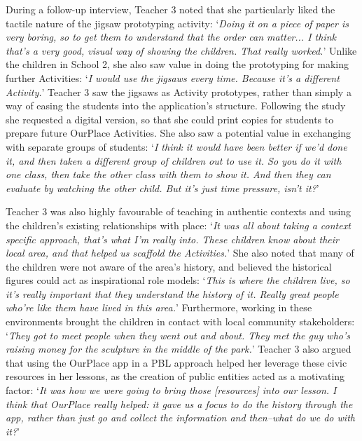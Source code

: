 \documentclass[,hyphens]{sigchi}
\begin{document}
During a follow-up interview, Teacher 3 noted that she particularly liked the tactile nature of the jigsaw prototyping activity: `\textit{Doing it on a piece of paper is very boring, so to get them to understand that the order can matter... I think that's a very good, visual way of showing the children. That really worked.}' Unlike the children in School 2, she also saw value in doing the prototyping for making further Activities: `\textit{I would use the jigsaws every time. Because it's a different Activity.}' Teacher 3 saw the jigsaws as Activity prototypes, rather than simply a way of easing the students into the application's structure. Following the study she requested a digital version, so that she could print copies for students to prepare future OurPlace Activities. She also saw a potential value in exchanging with separate groups of students: `\textit{I think it would have been better if we'd done it, and then taken a different group of children out to use it. So you do it with one class, then take the other class with them to show it. And then they can evaluate by watching the other child. But it's just time pressure, isn't it?}'

Teacher 3 was also highly favourable of teaching in authentic contexts and using the children's existing relationships with place: `\textit{It was all about taking a context specific approach, that's what I'm really into. These children know about their local area, and that helped us scaffold the Activities.}' She also noted that many of the children were not aware of the area's history, and believed the historical figures could act as inspirational role models: `\textit{This is where the children live, so it's really important that they understand the history of it. Really great people who're like them have lived in this area.}' Furthermore, working in these environments brought the children in contact with local community stakeholders: `\textit{They got to meet people when they went out and about. They met the guy who's raising money for the sculpture in the middle of the park.}' Teacher 3 also argued that using the OurPlace app in a PBL approach helped her leverage these civic resources in her lessons, as the creation of public entities acted as a motivating factor: `\textit{It was how we were going to bring those [resources] into our lesson. I think that OurPlace really helped: it gave us a focus to do the history through the app, rather than just go and collect the information and then--what do we do with it?}' 
\end{document}
